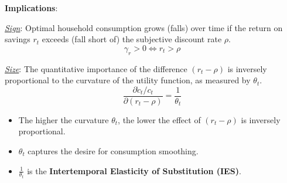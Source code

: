\noindent\textbf{Implications}:

\underline{\textit{Sign}}: Optimal household consumption grows (falls) over time if the return on savings $r_t$ exceeds (fall short of) the subjective discount rate $\rho$. \[
    \gamma_{r} > 0 \iff r_t > \rho
\]

\underline{\textit{Size}}: The quantitative importance of the difference $(r_t-\rho)$ is inversely proportional to the curvature of the utility function, as measured by $\theta_t$. \[
    \frac{\partial \dot{c}_t/c_t}{\partial (r_t - \rho)} = \frac{1}{\theta_t}
\]\begin{itemize}
    \item The higher the curvature $\theta_t$, the lower the effect of $(r_t-\rho)$ is inversely proportional.
    \item $\theta_t$ captures the desire for consumption smoothing.
    \item $\frac{1}{\theta_t}$ is the \textbf{Intertemporal Elasticity of Substitution (IES)}.
\end{itemize}


